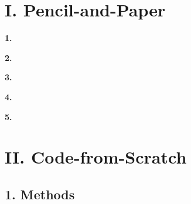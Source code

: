 

\usepackage{graphicx, amssymb, amsmath, listings, float, mathtools}
\usepackage{color, url}
\lstset{language = Python}
\lstset{breaklines}
\lstset{extendedchars=false}

\oddsidemargin 0in
\evensidemargin 0in
\textwidth 6.5in
\topmargin -0.6in
\textheight 9.0in




\section*{\Large I. Pencil-and-Paper}
\begin{description}
\item{\bf \large 1. }




\item{\bf \large 2. }


\item{\bf \large 3. }


\item{\bf \large 4. }


\item{\bf \large 5. }

\end{description}

\newpage
\section*{\Large II. Code-from-Scratch}

\subsection*{\large 1. Methods}

